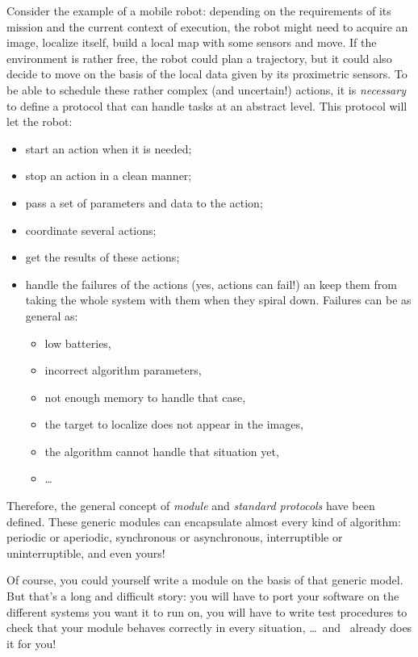 Consider the example of a mobile  robot: depending on the requirements of
its mission and the current context of execution, the robot might need to
acquire an image, localize itself,  build a local  map with some  sensors
and  move.  If the  environment  is rather free, the  robot  could plan a
trajectory, but  it could also  decide to move on the  basis of the local
data given by its  proximetric  sensors.  To be   able to schedule  these
rather complex (and uncertain!) actions, it  is \emph{necessary} to define
a protocol that can handle tasks at an abstract level. This protocol will
let the robot:

\begin{itemize}
\item start an action when it is needed;
\item stop an action in a clean manner;
\item pass a set of parameters and data to the action;
\item coordinate several actions;
\item get the results of these actions;
\item handle the failures of the actions (yes, actions can fail!) an keep
them from  taking the whole system with them when they spiral
down. Failures can be as general as:
   \begin{itemize}
   \item low batteries,
   \item incorrect algorithm parameters,
   \item not enough memory to handle that case,
   \item the target to localize does not appear in the images,
   \item the algorithm cannot handle that situation yet,
   \item \ldots
   \end{itemize}
\end{itemize}

Therefore,  the  general   concept  of  \emph{module}  and   \emph{standard
protocols}  have  been defined.   These  generic  modules can encapsulate
almost  every  kind of  algorithm:  periodic or aperiodic, synchronous or
asynchronous, interruptible or uninterruptible, and even yours!

Of course, you could yourself write a module on the basis of that generic
model. But that's a long and difficult story: you will  have to port your
software on the different systems you want it to run on, you will have to
write  test procedures to  check that  your  module behaves correctly  in
every situation, \ldots\ and \GenoM\ already does it for you!

